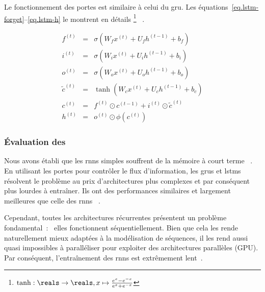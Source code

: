 Le fonctionnement des portes est similaire à celui du \gls{gru}.
Les équations~\ref{eq.lstm-forget}--\ref{eq.lstm-h} le montrent en détails%
\footnote{\(\tanh:\reals\to\reals, x\mapsto \frac{e^x - e^{-x}}{e^x + e^{-x}}\)}
~\cite{Hochreiter_Schmidhuber_1997}.

\begin{eqnarray}
    \label{eq.lstm-forget}
    f^{(t)} &=&\sigma\left(W_f x^{(t)}+U_f h^{(t-1)}+b_f\right) \\
    \label{eq.lstm-input}
    i^{(t)} &=&\sigma\left(W_i x^{(t)}+U_i h^{(t-1)}+b_i\right) \\
    \label{eq.lstm-out}
    o^{(t)} &=&\sigma\left(W_o x^{(t)}+U_o h^{(t-1)}+b_o\right) \\
    \label{eq.lstm-ctilde}
    \tilde{c}^{(t)} &=&\tanh\left(W_c x^{(t)}+U_c h^{(t-1)}+b_c\right) \\
    \label{eq.lstm-c}
    c^{(t)} &=&f^{(t)} \odot c^{(t-1)}+i^{(t)} \odot \tilde{c}^{(t)} \\
    \label{eq.lstm-h}
    h^{(t)} &=&o^{(t)} \odot \phi\left(c^{(t)}\right)
\end{eqnarray}

\subsubsection{Évaluation des }

Nous avons établi que les \glspl{rnn} simples souffrent de la mémoire à court terme%
~\cite{Bengio_Simard_Frasconi_1994,Pascanu_Mikolov_Bengio}.
En utilisant les portes pour contrôler le flux d'information,
les \glspl{gru} et \glspl{lstm} résolvent le problème au prix d'architectures plus complexes
et par conséquent plus lourdes à entraîner.
Ils ont des performances similaires et largement meilleures que celle des \glspl{rnn}%
~\cite{Chung_Gulcehre_Cho_Bengio_2014}.

Cependant, toutes les architectures récurrentes présentent un problème fondamental~:%
~elles fonctionnent séquentiellement.
Bien que cela les rende naturellement mieux adaptées à la modélisation de séquences,
il les rend aussi quasi impossibles à paralléliser pour exploiter des architectures parallèles (GPU).
Par conséquent, l'entraînement des \glspl{rnn} est extrêmement lent~\cite{Stahlberg_2020}.
